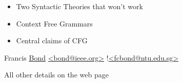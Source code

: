 \documentclass[a4paper,landscape,headrule,footrule]{foils}
\begin{document}
\maketitle

%


\begin{itemize}
\item Two Syntactic Theories that won’t work
\item Context Free Grammars
\item Central claims of CFG
\end{itemize}

\begin{description}
\item [Coordinator]  Francis \ul{Bond} 
{\small \url{<bond@ieee.org>} !\url{<fcbond@ntu.edu.sg>}}
\item All other details on the web page

\end{description}

\end{document}
